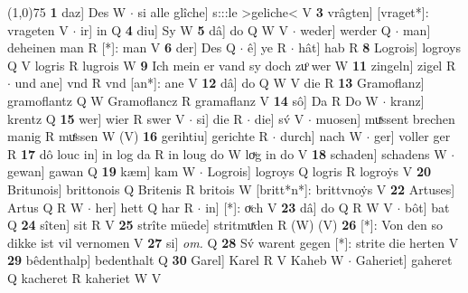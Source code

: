 \documentclass[8pt,a4paper,notitlepage]{article}
\begin{document}
\begin{table}[ht]
\begin{minipage}[t]{0.5\linewidth}
\line(1,0){75} \newline
\textbf{1} daz] Des W  $\cdot$ si alle glîche] s:::le >geliche< V \textbf{3} vrâgten] [vraget*]: vrageten V  $\cdot$ ir] in Q \textbf{4} diu] Sy W \textbf{5} dâ] do Q W V  $\cdot$ weder] werder Q  $\cdot$ man] deheinen man R [*]: man V \textbf{6} der] Des Q  $\cdot$ ê] ye R  $\cdot$ hât] hab R \textbf{8} Logrois] logroys Q V logris R lugrois W \textbf{9} Ich mein er vand sy doch zuͦ wer W \textbf{11} zingeln] zigel R  $\cdot$ und ane] vnd R vnd [an*]: ane V \textbf{12} dâ] do Q W V die R \textbf{13} Gramoflanz] gramoflantz Q W Gramoflancz R gramaflanz V \textbf{14} sô] Da R Do W  $\cdot$ kranz] krentz Q \textbf{15} wer] wier R swer V  $\cdot$ si] die R  $\cdot$ die] sv́ V  $\cdot$ muosen] muͯssent brechen manig R muͤssen W (V) \textbf{16} gerihtiu] gerichte R  $\cdot$ durch] nach W  $\cdot$ ger] voller ger R \textbf{17} dô louc in] in log da R in loug do W loͮg in do V \textbf{18} schaden] schadens W  $\cdot$ gewan] gawan Q \textbf{19} kæm] kam W  $\cdot$ Logrois] logroys Q logris R logroẏs V \textbf{20} Britunois] brittonois Q Britenis R britois W [britt*n*]: brittvnoẏs V \textbf{22} Artuses] Artus Q R W  $\cdot$ her] hett Q har R  $\cdot$ in] [*]: oͮch V \textbf{23} dâ] do Q R W V  $\cdot$ bôt] bat Q \textbf{24} sîten] sit R V \textbf{25} strîte müede] stritmuͯden R (W) (V) \textbf{26} [*]: Von den so dikke ist vil vernomen V \textbf{27} si] \textit{om.} Q \textbf{28} Sv́ warent gegen [*]: strite die herten V \textbf{29} bêdenthalp] bedenthalt Q \textbf{30} Garel] Karel R V Kaheb W  $\cdot$ Gaheriet] gaheret Q kacheret R kaheriet W V \newline
\end{minipage}
\end{table}
\end{document}
